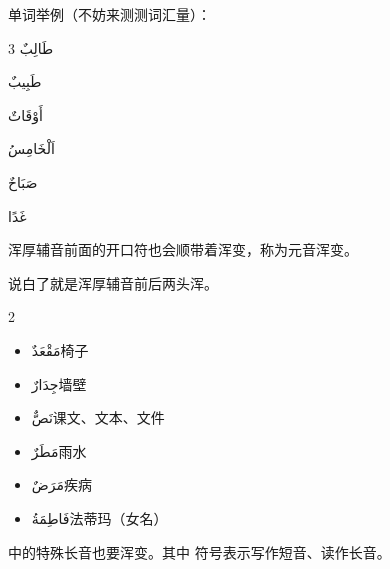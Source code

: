 单词举例（不妨来测测词汇量）：

\begin{Arabic}
    \begin{multicols}{3}
        طَالِبٌ
                
        طَبِيبٌ

        أَوْقَاتٌ

        اَلْخَامِسُ

        صَبَاحٌ

        غَدًا 
    \end{multicols}
\end{Arabic}

浑厚辅音前面的开口符也会顺带着浑变，称为元音浑变。

\begin{note}
    说白了就是浑厚辅音前后两头浑。
\end{note}

\begin{multicols}{2}
    \begin{itemize}
        \item \ac{مَقْعَدٌ}{椅子}
        \item \ac{جِدَارٌ}{墙壁}
        \item \ac{نَصٌّ}{课文、文本、文件}
        \item \ac{مَطَرٌ}{雨水}
        \item \ac{مَرَضٌ}{疾病}
        \item \ac{فَاطِمَةُ}{法蒂玛（女名）}
    \end{itemize}
\end{multicols}

 中的特殊长音也要浑变。其中  符号表示写作短音、读作长音。